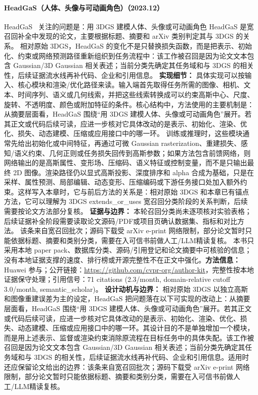 \paragraph{HeadGaS（人体、头像与可动画角色）（2023.12）}
HeadGaS~\cite{2312_02902} 关注的问题是：用 3DGS 建模人体、头像或可动画角色 HeadGaS 是宽召回补全中发现的论文，主要根据标题、摘要和 arXiv 类别判定其与 3DGS 的关系。
相对原始 3DGS，HeadGaS 的变化不是只替换损失函数，而是把表示、初始化、约束或网络预测路径重新组织到任务流程中：该工作被召回是因为论文文本包含 Gaussian/3D Gaussian 相关表述；当前分类先确定其任务域和与 3DGS 的相关性，后续证据流水线再补代码、企业和引用信息。
\textbf{实现细节：} 具体实现可以按输入、核心模块和渲染/优化路径来读。输入端首先取得任务所需的图像、相机、文本、时间序列、语义或几何线索，并把这些线索转换成可以约束高斯中心、尺度、旋转、不透明度、颜色或附加特征的条件。核心结构中，方法使用的主要机制是：从摘要层面看，HeadGaS 围绕“用 3DGS 建模人体、头像或可动画角色”展开。若其正文或代码后续可读，应进一步核对它具体改动的是表示、初始化、渲染、优化、损失、动态建模、压缩或应用接口中的哪一环。 训练或推理时，这些模块通常先给出初始化或中间特征，再通过可微 Gaussian rasterization、重建损失、感知/语义约束、几何正则或任务损失回传到高斯参数；如果方法包含前馈网络，则网络输出的是高斯属性、变形场、压缩码、语义特征或控制变量，而不是只输出最终 2D 图像。渲染路径仍以显式高斯投影、深度排序和 alpha 合成为基础，只是在采样、属性预测、局部编辑、动态变形、压缩编码或下游任务接口处加入额外约束。这样写入本章时，它与前后方法的关系是：相对原始 3DGS 和本章已有锚点方法，它可以理解为 3DGS extends\_or\_uses 宽召回分类阶段的关系判断，后续需要按论文方法部分复核。
\textbf{证据与边界：} 本轮召回分类尚未逐项核对实验表格；后续证据补全阶段需要读取论文源码/PDF或项目页确认数据集、指标和对比方法。 该条来自宽召回批次；源码下载受 arXiv e-print 网络限制，部分论文暂时只能依据标题、摘要和类别分类，需要在入可信书前做人工/LLM精读复核。 本书只采用本地 paper pack、数据库分类、源码/引用登记和论文摘要中可核验的信息；没有本地证据支撑的速度、排行榜或开源完整性不在正文中强化。\textbf{方法信息：} Huawei 参与；公开链接：\url{https://github.com/cvpr-org/author-kit}，完整性按本地证据保守处理；引用信号：71 citations (2.3/month, domain-relative cutoff 3.0/month, semantic\_scholar)。
\textbf{设计动机与边界：} 相对原始 3DGS 以独立高斯和图像重建误差为主的设定，HeadGaS 把问题落在以下可实现的改动上：从摘要层面看，HeadGaS 围绕“用 3DGS 建模人体、头像或可动画角色”展开。若其正文或代码后续可读，应进一步核对它具体改动的是表示、初始化、渲染、优化、损失、动态建模、压缩或应用接口中的哪一环。其设计目的不是单独增加一个模块，而是用上述表示、监督或渲染约束消除原流程在目标任务中的具体失配。该工作被召回是因为论文文本包含 Gaussian/3D Gaussian 相关表述；当前分类先确定其任务域和与 3DGS 的相关性，后续证据流水线再补代码、企业和引用信息。适用时还应保留论文给出的边界：该条来自宽召回批次；源码下载受 arXiv e-print 网络限制，部分论文暂时只能依据标题、摘要和类别分类，需要在入可信书前做人工/LLM精读复核。

